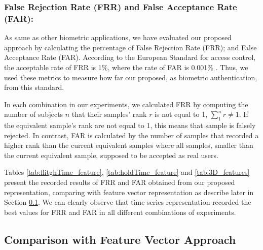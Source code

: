 \documentclass[runningheads,a4paper]{llncs}
\begin{document}
\subsubsection{False Rejection Rate (FRR) and False Acceptance Rate (FAR):}\label{far_and_frr}
As same as other biometric applications, we have evaluated our proposed approach by calculating the percentage of False Rejection Rate (FRR); and False Acceptance Rate (FAR). According to the European Standard for access control, the acceptable rate of FRR is 1\%, where the rate of FAR is 0.001\% \cite{polemi1997biometric}. Thus, we used these metrics to measure how far our proposed, as biometric authentication, from this standard.   

In each combination in our experiments, we calculated FRR by computing the number of subjects $n$ that their samples' rank $r$ is not equal to 1, $\sum_{1}^{n} r\neq 1$. If the equivalent sample's rank are not equal to 1, this means that sample is falsely rejected. In contrast, FAR is calculated by the number of samples that recorded a higher rank than the current equivalent samples where all samples, smaller than the current equivalent sample, supposed to be accepted as real users. 

Tables \ref{tab:flitghTime_feature}, \ref{tab:holdTime_feature} and \ref{tab:3D_features} present the recorded results of FRR and FAR obtained from our proposed representation, comparing with feature vector representation as describe later in Section \ref{subsec:compDestureVecApp}. We can clearly observe that time series representation recorded the best values for FRR and FAR in all different combinations of experiments. 
       

\subsection{Comparison with Feature Vector Approach} 
\label{subsec:compDestureVecApp}
\end{document}
